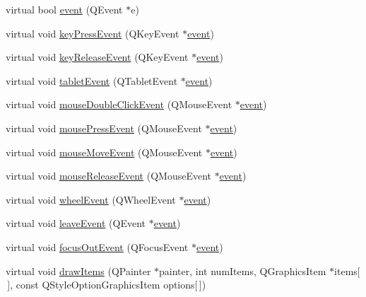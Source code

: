 \begin{DoxyCompactItemize}
virtual bool \hyperlink{class_u_b_board_view_a9052cd8486cf023aaff430a859f2f4af}{event} (Q\-Event $\ast$e)
\item 
virtual void \hyperlink{class_u_b_board_view_a9216e870eac1d8f36049186dc8ab1410}{key\-Press\-Event} (Q\-Key\-Event $\ast$\hyperlink{class_u_b_board_view_a9052cd8486cf023aaff430a859f2f4af}{event})
\item 
virtual void \hyperlink{class_u_b_board_view_a64d50d771a575166d7f5c9ad52aaf412}{key\-Release\-Event} (Q\-Key\-Event $\ast$\hyperlink{class_u_b_board_view_a9052cd8486cf023aaff430a859f2f4af}{event})
\item 
virtual void \hyperlink{class_u_b_board_view_ad5109e5f034af7b194f4dc6606fe16e6}{tablet\-Event} (Q\-Tablet\-Event $\ast$\hyperlink{class_u_b_board_view_a9052cd8486cf023aaff430a859f2f4af}{event})
\item 
virtual void \hyperlink{class_u_b_board_view_a43eb1207291905e9daa7c618a3c203bb}{mouse\-Double\-Click\-Event} (Q\-Mouse\-Event $\ast$\hyperlink{class_u_b_board_view_a9052cd8486cf023aaff430a859f2f4af}{event})
\item 
virtual void \hyperlink{class_u_b_board_view_a6fc3391590c435e0ae26c43d2bd76d14}{mouse\-Press\-Event} (Q\-Mouse\-Event $\ast$\hyperlink{class_u_b_board_view_a9052cd8486cf023aaff430a859f2f4af}{event})
\item 
virtual void \hyperlink{class_u_b_board_view_adf1b48aff41094593ba1054627b4c52b}{mouse\-Move\-Event} (Q\-Mouse\-Event $\ast$\hyperlink{class_u_b_board_view_a9052cd8486cf023aaff430a859f2f4af}{event})
\item 
virtual void \hyperlink{class_u_b_board_view_acc4206bbb27829580a337c81708be4a3}{mouse\-Release\-Event} (Q\-Mouse\-Event $\ast$\hyperlink{class_u_b_board_view_a9052cd8486cf023aaff430a859f2f4af}{event})
\item 
virtual void \hyperlink{class_u_b_board_view_a127153f054ca62fc556b398b4edf45b8}{wheel\-Event} (Q\-Wheel\-Event $\ast$\hyperlink{class_u_b_board_view_a9052cd8486cf023aaff430a859f2f4af}{event})
\item 
virtual void \hyperlink{class_u_b_board_view_a35bbcf045afccb4bb80b966a29c333e2}{leave\-Event} (Q\-Event $\ast$\hyperlink{class_u_b_board_view_a9052cd8486cf023aaff430a859f2f4af}{event})
\item 
virtual void \hyperlink{class_u_b_board_view_a75607af38a7dcfc8299a7f441e5a822f}{focus\-Out\-Event} (Q\-Focus\-Event $\ast$\hyperlink{class_u_b_board_view_a9052cd8486cf023aaff430a859f2f4af}{event})
\item 
virtual void \hyperlink{class_u_b_board_view_afec76b8b1ffab6b5a335e509dd62338c}{draw\-Items} (Q\-Painter $\ast$painter, int num\-Items, Q\-Graphics\-Item $\ast$items\mbox{[}$\,$\mbox{]}, const Q\-Style\-Option\-Graphics\-Item options\mbox{[}$\,$\mbox{]})

\end{DoxyCompactItemize}

